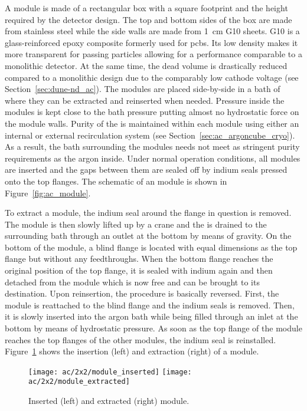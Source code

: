 A module is made of a rectangular box with a square footprint and the height required by the detector design.
The top and bottom sides of the box are made from stainless steel while the side walls are made from \SI{1}{\centi\metre} G10 sheets.
G10 is a glass-reinforced epoxy composite formerly used for \glspl{pcb}.
Its low density makes it more transparent for passing particles allowing for a performance comparable to a monolithic detector.
At the same time, the dead volume is drastically reduced compared to a monolithic design due to the comparably low cathode voltage (see Section~\ref{sec:dune-nd_ac}).
The modules are placed side-by-side in a bath of \lar{} where they can be extracted and reinserted when needed.
Pressure inside the modules is kept close to the bath pressure putting almost no hydrostatic force on the module walls.
Purity of the \lar{} is maintained within each module using either an internal or external recirculation system (see Section~\ref{sec:ac_argoncube_cryo}).
As a result, the bath surrounding the modules needs not meet as stringent purity requirements as the argon inside.
Under normal operation conditions, all modules are inserted and the gaps between them are sealed off by indium seals pressed onto the top flanges.
The schematic of an \AC{} module is shown in Figure~\ref{fig:ac_module}.

To extract a module, the indium seal around the flange in question is removed.
The module is then slowly lifted up by a crane and the \lar{} is drained to the surrounding bath through an outlet at the bottom by means of gravity.
On the bottom of the module, a blind flange is located with equal dimensions as the top flange but without any feedthroughs.
When the bottom flange reaches the original position of the top flange, it is sealed with indium again and then detached from the module which is now free and can be brought to its destination.
Upon reinsertion, the procedure is basically reversed.
First, the module is reattached to the blind flange and the indium seals is removed.
Then, it is slowly inserted into the argon bath while being filled through an inlet at the bottom by means of hydrostatic pressure.
As soon as the top flange of the module reaches the top flanges of the other modules, the indium seal is reinstalled.
Figure~\ref{fig:ac_module-ins-ext} shows the insertion (left) and extraction (right) of a module.

\begin{figure}[htb]
	\centering
	\texttt{[image: ac/2x2/module\_inserted]}
	\texttt{[image: ac/2x2/module\_extracted]}
	\caption[\AC{} module insertion and extraction]{%
		Inserted (left) and extracted (right) module.
	}
	\label{fig:ac_module-ins-ext}
\end{figure}

